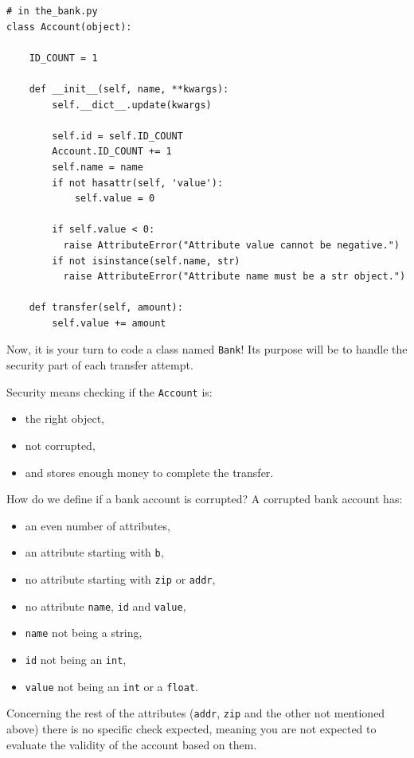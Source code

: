 \documentclass{42-en}
\begin{document}
\begin{verbatim}
# in the_bank.py
class Account(object):

    ID_COUNT = 1

    def __init__(self, name, **kwargs):
        self.__dict__.update(kwargs)
        
        self.id = self.ID_COUNT
        Account.ID_COUNT += 1
        self.name = name
        if not hasattr(self, 'value'):
            self.value = 0

        if self.value < 0:
          raise AttributeError("Attribute value cannot be negative.")
        if not isinstance(self.name, str)
          raise AttributeError("Attribute name must be a str object.")
    
    def transfer(self, amount):
        self.value += amount
\end{verbatim}

Now, it is your turn to code a class named \texttt{Bank}!
Its purpose will be to handle the security part of each transfer attempt.

Security means checking if the \texttt{Account} is:
\begin{itemize}
  \item the right object,
  \item not corrupted,
  \item and stores enough money to complete the transfer.
\end{itemize}

How do we define if a bank account is corrupted? A corrupted bank account has:
\begin{itemize}
  \item an even number of attributes,
  \item an attribute starting with \texttt{b},
  \item no attribute starting with \texttt{zip} or \texttt{addr},
  \item no attribute \texttt{name}, \texttt{id} and \texttt{value},
  \item \texttt{name} not being a string,
  \item \texttt{id} not being an \texttt{int},
  \item \texttt{value} not being an \texttt{int} or a \texttt{float}.
\end{itemize}

Concerning the rest of the attributes (\texttt{addr}, \texttt{zip} and the other not mentioned above)
there is no specific check expected, meaning you are not expected to evaluate the validity of the account based on them.
\end{document}
